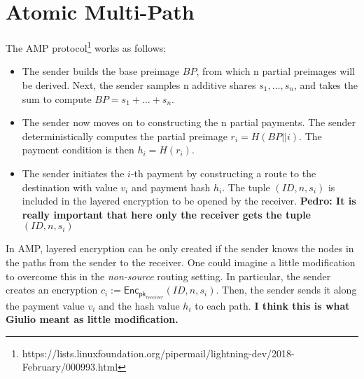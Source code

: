 \section{Atomic Multi-Path}

The AMP protocol\footnote{https://lists.linuxfoundation.org/pipermail/lightning-dev/2018-February/000993.html} works as follows:

\begin{itemize}
	\item The sender builds the base preimage $\textit{BP}$, from which n 
	partial preimages will be derived. Next, the sender samples n additive shares $s_1,\ldots, s_n$, and takes the sum to compute 
	$\textit{BP} = s_1 + \ldots + s_n$.
	
	\item The sender now moves on to constructing the
n partial payments. The sender deterministically
computes the partial preimage $r_i = H(\textit{BP} ||  i)$. The payment 
condition is then $h_i = H(r_i)$. 

	\item The sender initiates the $i$-th payment by
constructing a route to the destination with 
value $v_i$ and payment hash $h_i$.
The tuple $(\textit{ID}, n, s_i)$ is included in the layered encryption 
to be opened by the receiver. {\bf Pedro: It is really important 
that here only the receiver gets the tuple $(\textit{ID}, n, s_i)$}
\end{itemize}


 In AMP, layered encryption can be only created if the sender knows the nodes in the paths from the sender to the receiver. One could imagine a little modification to overcome this in the \emph{non-source} routing setting. In particular, the sender creates an encryption $c_i := \textsf{Enc}_{\textsf{pk}_{\textit{receiver}}}(\textit{ID}, n, s_i)$. Then, the sender sends it along the payment value $v_i$ and the hash value $h_i$ to each path. \textbf{I think this is what Giulio meant as little modification.}
 

